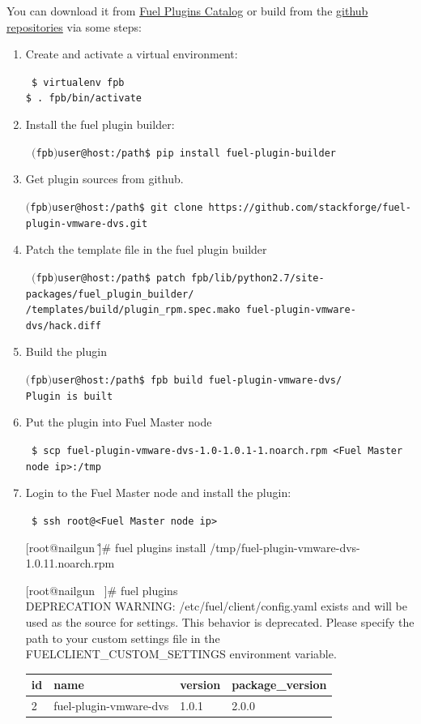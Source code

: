 \documentclass{article}
\begin{document}
You can download it from \href{https://www.mirantis.com/products/openstack-drivers-and-plugins/fuel-plugins/}{Fuel Plugins Catalog} or build from the \href{https://github.com/stackforge/fuel-plugin-vmware-dvs}{github repositories} via some steps:

\begin{enumerate}

\item Create and activate a virtual environment:

{\tt
\$ virtualenv fpb \\\$ . fpb/bin/activate
}

\item Install the fuel plugin builder:

{\tt
$($fpb$)$user@host:/path\$ pip install fuel-plugin-builder
}

\item Get plugin sources from github.

{\tt $($fpb$)$user@host:/path\$ git clone https://github.com/stackforge/fuel-plugin-vmware-dvs.git}

\item Patch the template file in the fuel plugin builder

{\tt
$($fpb$)$user@host:/path\$ patch  fpb/lib/python2.7/site-packages/fuel\_plugin\_builder/ \\
                /templates/build/plugin\_rpm.spec.mako fuel-plugin-vmware-dvs/hack.diff
}

\item Build the plugin

{\tt $($fpb$)$user@host:/path\$ fpb \textemdash\textemdash build fuel-plugin-vmware-dvs/ \\
Plugin is built}

\item Put the plugin into Fuel Master node

{\tt
\$ scp fuel-plugin-vmware-dvs-1.0-1.0.1-1.noarch.rpm <Fuel Master node ip>:/tmp
}

\item Login to the Fuel Master node and install the plugin:

{\tt
\$ ssh root@<Fuel Master node ip>

[root@nailgun \~]\# fuel plugins \textemdash\textemdash install /tmp/fuel-plugin-vmware-dvs-1.0.1\-1.noarch.rpm

[root@nailgun ~]\# fuel plugins \\
DEPRECATION WARNING: /etc/fuel/client/config.yaml exists and will be used as the source for settings. This behavior is deprecated. Please specify the path to your custom settings file in the FUELCLIENT\_CUSTOM\_SETTINGS environment variable.\\

\begin{tabular}{l|l|l|l}
id & name                   & version & package\_version\\
\hline
2  & fuel-plugin-vmware-dvs & 1.0.1   &2.0.0          \\
\end{tabular}
}

\end{enumerate}
\end{document}
